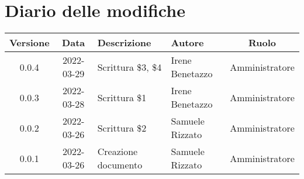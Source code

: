 \section*{Diario delle modifiche}
	\begin{center}
	\renewcommand{\arraystretch}{1.8} %
	\begin{tabular}{ |c|c|m{12em}|m{7em}|c| }
	\hline
	\textbf{Versione} & \textbf{Data} & \textbf{Descrizione} &  \textbf{Autore} &  \textbf{Ruolo} \\ %
	\hline
	0.0.4 & 2022-03-29 & Scrittura \$3, \$4 & Irene Benetazzo & Amministratore\\
	\hline
    0.0.3 & 2022-03-28 & Scrittura \$1 & Irene Benetazzo & Amministratore\\
	\hline
    0.0.2 & 2022-03-26 & Scrittura \$2 & Samuele \newline Rizzato & Amministratore\\
	\hline
    0.0.1 & 2022-03-26 & Creazione documento & Samuele \newline Rizzato & Amministratore\\
	\hline
	\end{tabular}
	\end{center}
	\newpage